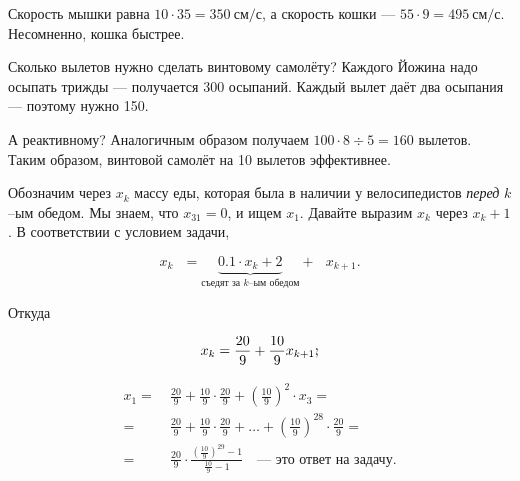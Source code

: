\begin{itemize}
\itA Скорость мышки равна $10 \cdot 35 = \SI{350}{\text{см}/\text{с}}$, а скорость кошки — $55 \cdot 9 = \SI{495}{\text{см}/\text{с}}$. Несомненно, кошка быстрее.

\itB Сколько вылетов нужно сделать винтовому самолёту? Каждого Йожина надо осыпать трижды — получается 300 осыпаний. Каждый вылет даёт два осыпания — поэтому нужно 150.

\ms А реактивному? Аналогичным образом получаем $100 \cdot 8 \div 5 = 160$ вылетов. Таким образом, винтовой самолёт на 10 вылетов эффективнее.

\itC Обозначим через $x_k$ массу еды, которая была в наличии у велосипедистов {\itshape перед} $k$--ым обедом. Мы знаем, что $x_{31}=0$, и ищем $x_1$. Давайте выразим $x_k$ через $x_k+1$. В соответствии с условием задачи,

$$x_k\ \ \ = \underbrace{0.1 \cdot x_k + 2}_{\text{съедят за $k$--ым обедом}} +\ \ \ x_{k+1}.$$

Откуда

$$x_k = \frac{20}{9} + \frac{10}{9} x_{k+1}\scolon$$

\begin{align*}
x_1 =\ & \frac{20}{9} + \frac{10}{9} \cdot \frac{20}{9} + \left(\frac{10}{9}\right)^2 \cdot x_3 = \\
=\ & \frac{20}{9} + \frac{10}{9} \cdot \frac{20}{9} + \ldots + \left(\frac{10}{9}\right)^{28}
	\cdot\frac{20}{9} = \\
=\ & \frac{20}{9} \cdot \frac{\left(\tfrac{10}{9}\right)^{29}-1}{\tfrac{10}{9}-1}
	\quad \text{— это ответ на задачу.}
\end{align*}

\end{itemize}